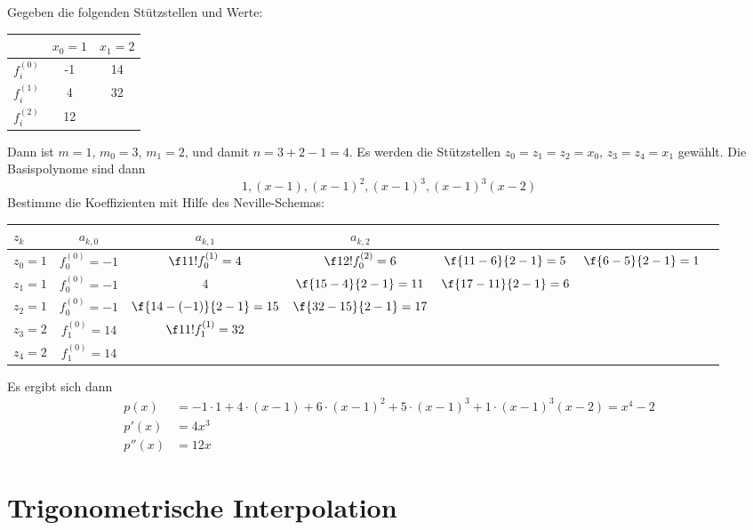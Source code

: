 \documentclass[11pt]{scrbook}
\begin{document}
\begin{ex*}
	Gegeben die folgenden Stützstellen und Werte: \\

	\begin{table}[H]
		\centering	
		\begin{tabular}{l|c|c}
			 & $x_0=1$ & $x_1 =2$ \\ \hline
			$f_i^{(0)}$ & -1 & 14 \\
			$f_i^{(1)}$ & 4 & 32 \\
			$f_i^{(2)}$ & 12 & 
		\end{tabular}		
	\end{table}

	Dann ist $m=1$, $m_0=3$, $m_1=2$, und damit $n=3+2-1=4$.
	Es werden die Stützstellen $z_0=z_1=z_2=x_0$, $z_3=z_4=x_1$ gewählt.
	Die Basispolynome sind dann
	\[
		1, (x-1), (x-1)^2, (x-1)^3, (x-1)^3(x-2)
	\]
	Bestimme die Koeffizienten mit Hilfe des Neville-Schemas: \\

	\begin{table}[H]
		\centering	
		\begin{tabular}{l|c|c|c|c|c|c}
			$z_k$  & $a_{k,0}$ & $a_{k,1}$ & $a_{k,2}$ \\ \hline
			$z_0=1$ & $f_0^{(0)} = -1$  & $\f 1{1!}f_0^{(1)} = 4$ & $\f 1{2!} f_0^{(2)} = 6$ & $\f {11-6}{2-1}=5$ & $\f {6-5}{2-1}=1$ \\
			$z_1=1$ & $f_0^{(0)} = -1$ & $4$ 						&	$\f {15-4}{2-1} = 11$ & $\f {17-11}{2-1}=6$ \\
			$z_2=1$ & $f_0^{(0)} = -1$ & $\f {14-(-1)}{2-1} = 15$ & $\f {32-15}{2-1} = 17$ \\
			$z_3=2$ & $f_1^{(0)} = 14$ & $\f 1 {1!} f_1^{(1)} = 32$ &  \\
			$z_4=2$ & $f_1^{(0)} = 14$ & 
		\end{tabular}		
	\end{table}
	Es ergibt sich dann
	\begin{align*}
		p(x)& = -1\cdot 1 + 4\cdot (x-1) + 6\cdot(x-1)^2 + 5\cdot(x-1)^3 + 1\cdot(x-1)^3 (x-2) = x^4-2\\
		p'(x) &= 4x^3\\
		p''(x) &= 12x
	\end{align*}
\end{ex*}


\section{Trigonometrische Interpolation}
\end{document}
